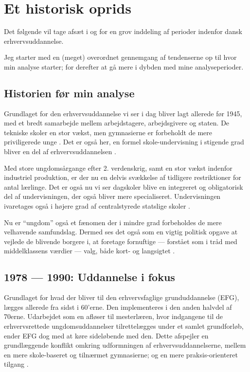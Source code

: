 \section{Et historisk oprids}

Det følgende vil tage afsæt i \cite{bondergaardHistoricalEmergenceKey2014} og \cite{juulDiskurserOmUngdom2013} for en grov inddeling af perioder indenfor dansk erhvervsuddannelse.

Jeg starter med en (meget) overordnet gennemgang af tendenserne op til hvor min analyse starter; for derefter at gå mere i dybden med mine analyseperioder.

\subsection{Historien før min analyse}

 Grundlaget for den erhvervsuddannelse vi ser i dag bliver lagt allerede før 1945, med et bredt samarbejde mellem arbejdstagere, arbejdsgivere og staten.
De tekniske skoler en stor vækst, men gymnasierne er forbeholdt de mere priviligerede unge \autocite[s. 9]{bondergaardHistoricalEmergenceKey2014}.
Det er også her, en formel skole-undervisning i stigende grad bliver en del af erhvervsuddannelsen \autocite[s. 15ff]{bondergaardHistoricalEmergenceKey2014}. 

Med store ungdomsårgange efter 2. verdenskrig, samt en stor vækst indenfor industriel produktion, er der nu en delvis svækkelse af tidligere restriktioner for antal lærlinge.
Det er også nu vi ser dagskoler blive en integreret og obligatorisk del af undervisningen, der også bliver mere specialiseret.
Undervisningen ivaretages også i højere grad af centralstyrede statslige skoler \autocite[s. 35]{bondergaardHistoricalEmergenceKey2014}.

Nu er “ungdom” også et fænomen der i mindre grad forbeholdes de mere velhavende samfundslag.
Dermed ses det også som en vigtig politisk opgave at vejlede de blivende borgere i, at foretage fornuftige — forstået som i tråd med middelklassens værdier — valg, både kort- og langsigtet \autocite[s. 13ff]{juulDiskurserOmUngdom2013}.

\subsection{1978 — 1990: Uddannelse i fokus}
Grundlaget for hvad der bliver til den erhvervsfaglige grunduddannelse (EFG), lægges allerede fra sidst i 60'erne.
Den implementeres i den anden halvdel af 70erne.
Udarbejdet som en afløser til mesterlæren, hvor indgangene til de erhvervsrettede ungdomsuddannelser tilrettelægges under et samlet grundforløb, ender EFG dog med at køre sideløbende med den. 
Dette afspejler en grundlæggende konflikt omkring udformningen af erhvervsuddannelserne, mellem en mere skole-baseret og tilnærmet gymnasierne; og en mere praksis-orienteret tilgang \autocite[s. 49ff, 57]{bondergaardHistoricalEmergenceKey2014}.

